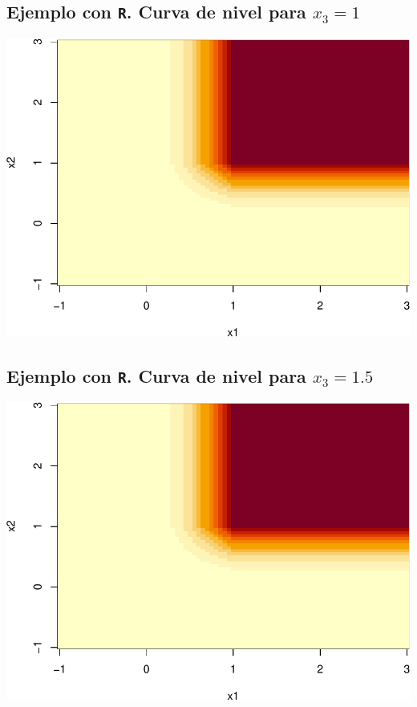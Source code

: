 \documentclass[]{book}
\begin{document}
\hypertarget{ejemplo-con-r.-curva-de-nivel-para-x_31}{%
\subsection{\texorpdfstring{Ejemplo con \texttt{R}. Curva de nivel para \(x_3=1\)}{Ejemplo con R. Curva de nivel para x\_3=1}}\label{ejemplo-con-r.-curva-de-nivel-para-x_31}}

\begin{center}\includegraphics{curso-probabilidad-udemy_files/figure-latex/unnamed-chunk-156-1} \end{center}

\hypertarget{ejemplo-con-r.-curva-de-nivel-para-x_31.5}{%
\subsection{\texorpdfstring{Ejemplo con \texttt{R}. Curva de nivel para \(x_3=1.5\)}{Ejemplo con R. Curva de nivel para x\_3=1.5}}\label{ejemplo-con-r.-curva-de-nivel-para-x_31.5}}

\begin{center}\includegraphics{curso-probabilidad-udemy_files/figure-latex/unnamed-chunk-157-1} \end{center}
\end{document}
